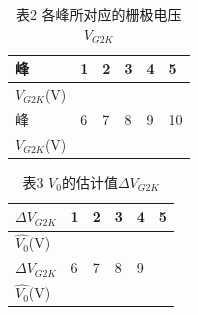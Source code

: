 \documentclass{ctexart}
\begin{document}
\begin{table}[ht]
\centering
\caption*{表2 \hspace{3em}各峰所对应的栅极电压$V_{G2K}$}
\renewcommand\arraystretch{1.1}
\begin{tabular}{C{5em}|C{4em}|C{4em}|C{4em}|C{4em}|C{4em}}
\hline
\hline
峰 & 1 & 2 & 3 & 4 & 5 \\
\hline
$V_{G2K}$(V) &  &  &  &  &  \\
\hline
\hline
峰 & 6 & 7 & 8 & 9 & 10 \\
\hline
$V_{G2K}$(V) &  &  &  &  &  \\
\hline
\hline
\end{tabular}
\end{table}
\begin{table}[ht]
\centering
\caption*{表3 \hspace{3em}$V_0$的估计值$\Delta V_{G2K}$}
\renewcommand\arraystretch{1.1}
\begin{tabular}{C{5em}|C{4em}|C{4em}|C{4em}|C{4em}|C{4em}}
\hline
\hline
$\Delta V_{G2K}$ & 1 & 2 & 3 & 4 & 5 \\
\hline
$\hat{V_0}$(V) &  &  &  &  &  \\
\hline
\hline
$\Delta V_{G2K}$ & 6 & 7 & 8 & 9 &  \\
$\hat{V_0}$(V) &  &  &  &  &  \\
\hline
\hline
\end{tabular}
\end{table}
\end{document}
